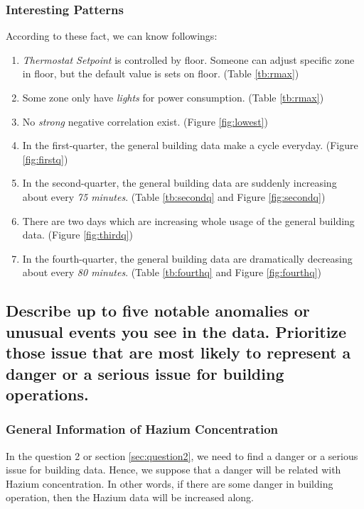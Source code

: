 \documentclass[aps, 10pt, a4paper]{article}
\begin{document}
            \subsubsection{Interesting Patterns}                                
                According to these fact, we can know followings:
                \begin{enumerate}
                    \item \textit{Thermostat Setpoint} is controlled by floor. Someone can adjust specific zone in floor, but the default value is sets on floor. (Table \ref{tb:rmax})
                    \item Some zone only have \textit{lights} for power consumption. (Table \ref{tb:rmax})
                    \item No \textit{strong} negative correlation exist. (Figure \ref{fig:lowest})
                    \item In the first-quarter, the general building data make a cycle everyday. (Figure \ref{fig:firstq})
                    \item In the second-quarter, the general building data are suddenly increasing about every \textit{75 minutes}. (Table \ref{tb:secondq} and Figure \ref{fig:secondq})
                    \item There are two days which are increasing whole usage of the general building data. (Figure \ref{fig:thirdq})
                    \item  In the fourth-quarter, the general building data are dramatically decreasing about every \textit{80 minutes}. (Table \ref{tb:fourthq} and Figure \ref{fig:fourthq})
                \end{enumerate}
        
        \subsection[Question 3]{Describe up to five notable anomalies or unusual events you see in the data. Prioritize those issue that are most likely to represent a danger or a serious issue for building operations.}
            \label{sec:question3}
            \subsubsection{General Information of Hazium Concentration}
                In the question 2 or section \ref{sec:question2}, we need to find a danger or a serious issue for building data. Hence, we suppose that a danger will be related with Hazium concentration. In other words, if there are some danger in building operation, then the Hazium data will be increased along. 
                
\end{document}
